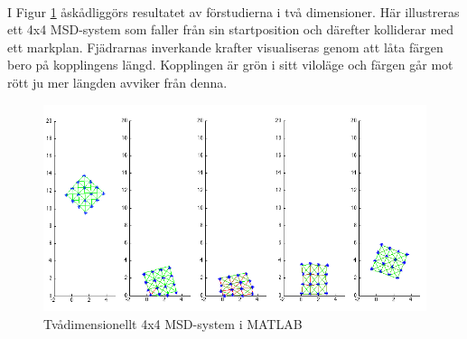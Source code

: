 \documentclass[a4paper,12pt,oneside,final,swedish]{extarticle}
\begin{document}
\noindent \\I Figur \ref{tvådim::nonfloat} åskådliggörs resultatet av förstudierna i två dimensioner. Här illustreras ett 4x4 MSD-system som faller från sin startposition och därefter kolliderar med ett markplan.
Fjädrarnas inverkande krafter visualiseras genom att låta färgen bero på kopplingens längd. 
Kopplingen är grön i sitt viloläge och färgen går mot rött ju mer längden avviker från denna.

\begin{figure}[h!]
  \begin{center}
    \includegraphics[width=16cm]{Bilder/boing.png} 
  \end{center}
  \caption{Tvådimensionellt 4x4 MSD-system i MATLAB}
  \label{tvådim::nonfloat}
\end{figure}
\end{document}
